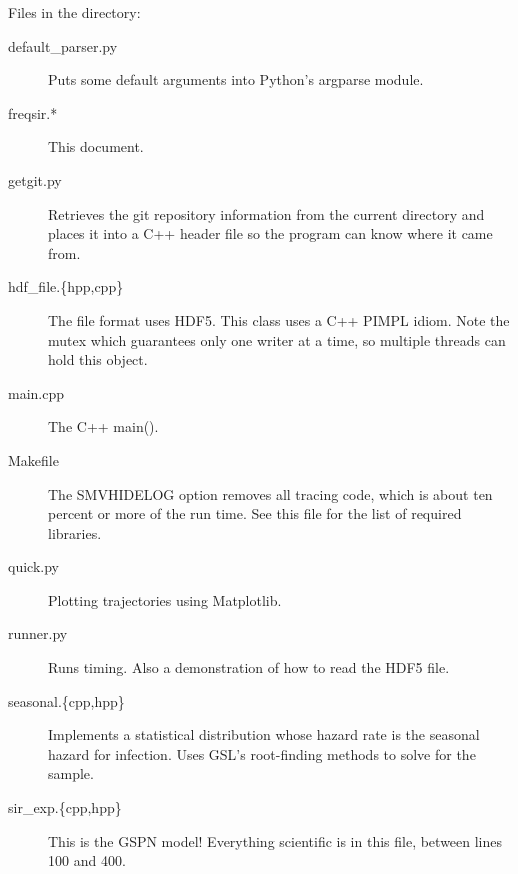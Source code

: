 \documentclass{article}
\begin{document}
Files in the directory:
\begin{description}
  \item[default\_parser.py] Puts some default arguments into Python's argparse module.
  \item[freqsir.*] This document.
  \item[getgit.py] Retrieves the git repository information from the current
  directory and places it into a C++ header file so the program can know
  where it came from.
  \item[hdf\_file.\{hpp,cpp\}] The file format uses HDF5. This class
  uses a C++ PIMPL idiom. Note the mutex which guarantees only one
  writer at a time, so multiple threads can hold this object.
  \item[main.cpp] The C++ main().
  \item[Makefile] The SMVHIDELOG option removes all tracing code, which
  is about ten percent or more of the run time. See this file for the
  list of required libraries.
  \item[quick.py] Plotting trajectories using Matplotlib.
  \item[runner.py] Runs timing. Also a demonstration of how to read
  the HDF5 file.
  \item[seasonal.\{cpp,hpp\}] Implements a statistical distribution
  whose hazard rate is the seasonal hazard for infection. Uses
  GSL's root-finding methods to solve for the sample.
  \item[sir\_exp.\{cpp,hpp\}] This is the GSPN model! Everything
  scientific is in this file, between lines 100 and 400.
\end{description}



\end{document}
